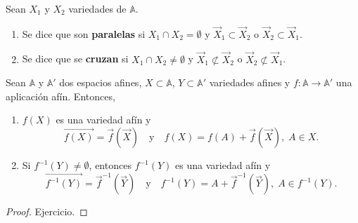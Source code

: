 \begin{definition}
Sean $\displaystyle X_{1} $ y $\displaystyle X_{2} $ variedades de $\displaystyle \mathbb{A} $. 
\begin{enumerate}
\item Se dice que son \textbf{paralelas} si $\displaystyle X_{1} \cap X_{2} = \emptyset $ y $\displaystyle \overrightarrow{X}_{1} \subset \overrightarrow{X}_{2} $ o $\displaystyle \overrightarrow{X}_{2} \subset \overrightarrow{X}_{1} $.
\item Se dice que se \textbf{cruzan} si $\displaystyle X_{1} \cap X_{2} \neq \emptyset $ y $\displaystyle \overrightarrow{X}_{1} \not\subset \overrightarrow{X}_{2} $ o $\displaystyle \overrightarrow{X}_{2} \not\subset \overrightarrow{X}_{1} $. 
\end{enumerate}
\end{definition}
\begin{prop}
Sean $\displaystyle \mathbb{A} $ y $\displaystyle \mathbb{A}' $ dos espacios afines, $\displaystyle X \subset \mathbb{A} $, $\displaystyle Y \subset \mathbb{A}' $ variedades afines y $\displaystyle f : \mathbb{A} \to \mathbb{A}' $ una aplicación afín. Entonces,
\begin{enumerate}
\item $\displaystyle f\left(X\right) $ es una variedad afín y 
	\[\overrightarrow{f\left(X\right)} = \vec{f}\left(\overrightarrow{X}\right) \quad \text{y} \quad f\left(X\right) = f\left(A\right) + \vec{f}\left(\overrightarrow{X}\right), \; A \in X .\]
\item Si $\displaystyle f^{-1}\left(Y\right) \neq \emptyset $, entonces $\displaystyle f^{-1}\left(Y\right) $ es una variedad afín y
	\[\overrightarrow{f^{-1}\left(Y\right)} = \vec{f}^{-1}\left(\overrightarrow{Y}\right) \quad \text{y} \quad f^{-1}\left(Y\right)= A + \vec{f}^{-1}\left(\overrightarrow{Y}\right), \; A \in f^{-1}\left(Y\right) .\]
\end{enumerate}
\end{prop}
\begin{proof}
Ejercicio.
\end{proof}

